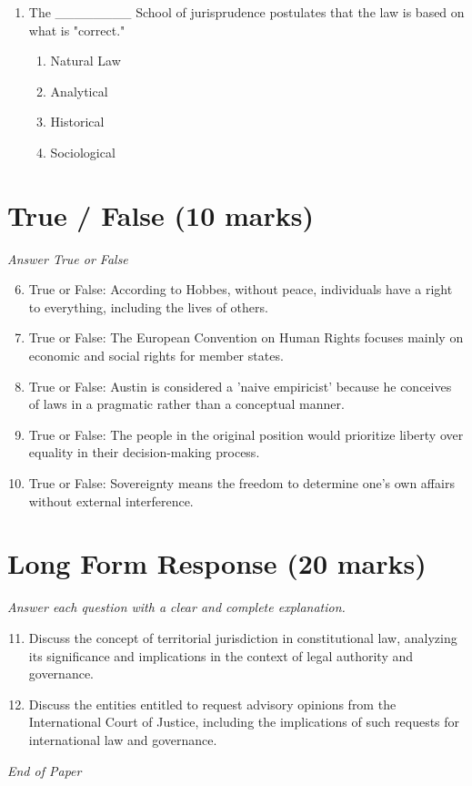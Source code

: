 \documentclass[12pt]{article}
\begin{document}
\begin{enumerate}[label=\arabic*.]
\begin{enumerate}[label=(\alph*)]
    \item Codification ossifies the law.
    \item Bentham fails to take account of the criminal law.
    \item Significant portions of the law are already codified.
\end{enumerate}
\item The \_\_\_\_\_\_\_\_ School of jurisprudence postulates that the law is based on what is "correct."
\begin{enumerate}[label=(\alph*)]
    \item Natural Law
    \item Analytical
    \item Historical
    \item Sociological
\end{enumerate}
\end{enumerate}

\section*{True / False (10 marks)}
\textit{Answer True or False}
\begin{enumerate}[label=\arabic*.]
\setcounter{enumi}{5}
\item True or False: According to Hobbes, without peace, individuals have a right to everything, including the lives of others.
\item True or False: The European Convention on Human Rights focuses mainly on economic and social rights for member states.
\item True or False: Austin is considered a 'naive empiricist' because he conceives of laws in a pragmatic rather than a conceptual manner.
\item True or False: The people in the original position would prioritize liberty over equality in their decision-making process.
\item True or False: Sovereignty means the freedom to determine one's own affairs without external interference.
\end{enumerate}

\section*{Long Form Response (20 marks)}
\textit{Answer each question with a clear and complete explanation.}
\begin{enumerate}[label=\arabic*.]
\setcounter{enumi}{10}
\item Discuss the concept of territorial jurisdiction in constitutional law, analyzing its significance and implications in the context of legal authority and governance.
\item Discuss the entities entitled to request advisory opinions from the International Court of Justice, including the implications of such requests for international law and governance.
\end{enumerate}

\vfill
\noindent\textit{End of Paper}
\end{document}
